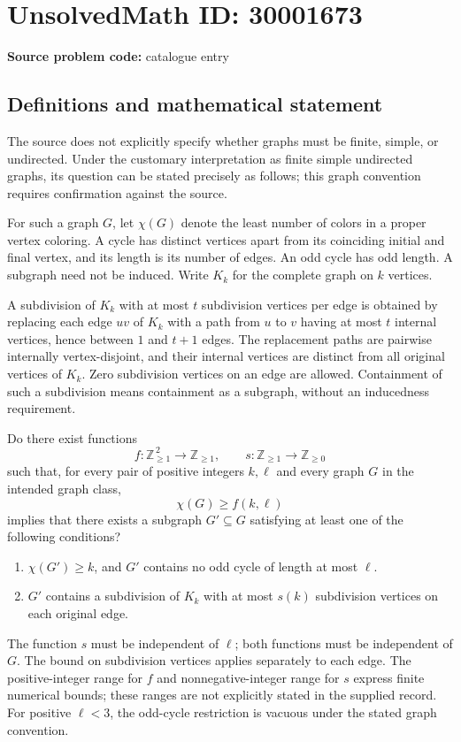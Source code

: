 \documentclass[11pt]{article}
\begin{document}
\section*{UnsolvedMath ID: 30001673}
\textbf{Source problem code:} catalogue entry
\subsection{Definitions and mathematical statement}
The source does not explicitly specify whether graphs must be finite, simple, or undirected. Under the customary interpretation as finite simple undirected graphs, its question can be stated precisely as follows; this graph convention requires confirmation against the source.

For such a graph \(G\), let \(\chi(G)\) denote the least number of colors in a proper vertex coloring. A cycle has distinct vertices apart from its coinciding initial and final vertex, and its length is its number of edges. An odd cycle has odd length. A subgraph need not be induced. Write \(K_k\) for the complete graph on \(k\) vertices.

A subdivision of \(K_k\) with at most \(t\) subdivision vertices per edge is obtained by replacing each edge \(uv\) of \(K_k\) with a path from \(u\) to \(v\) having at most \(t\) internal vertices, hence between \(1\) and \(t+1\) edges. The replacement paths are pairwise internally vertex-disjoint, and their internal vertices are distinct from all original vertices of \(K_k\). Zero subdivision vertices on an edge are allowed. Containment of such a subdivision means containment as a subgraph, without an inducedness requirement.

Do there exist functions
\[
f:\mathbb Z_{\geq 1}^{\,2}\longrightarrow\mathbb Z_{\geq 1},
\qquad
s:\mathbb Z_{\geq 1}\longrightarrow\mathbb Z_{\geq 0}
\]
such that, for every pair of positive integers \(k,\ell\) and every graph \(G\) in the intended graph class,
\[
\chi(G)\geq f(k,\ell)
\]
implies that there exists a subgraph \(G'\subseteq G\) satisfying at least one of the following conditions?
\begin{enumerate}
\item \(\chi(G')\geq k\), and \(G'\) contains no odd cycle of length at most \(\ell\).
\item \(G'\) contains a subdivision of \(K_k\) with at most \(s(k)\) subdivision vertices on each original edge.
\end{enumerate}
The function \(s\) must be independent of \(\ell\); both functions must be independent of \(G\). The bound on subdivision vertices applies separately to each edge. The positive-integer range for \(f\) and nonnegative-integer range for \(s\) express finite numerical bounds; these ranges are not explicitly stated in the supplied record. For positive \(\ell<3\), the odd-cycle restriction is vacuous under the stated graph convention.
\end{document}
